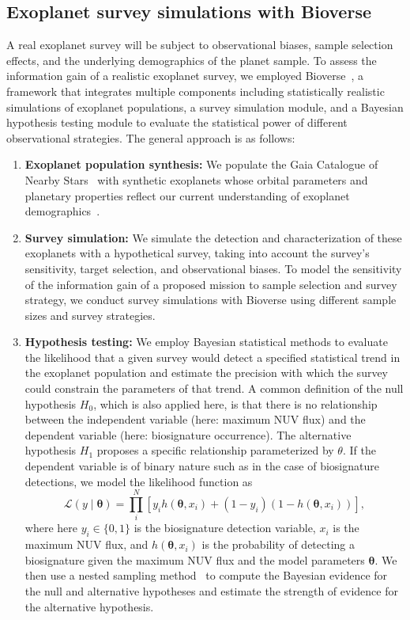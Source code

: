 \documentclass[twocolumn,twocolappendix,linenumbers]{aastex631}
\begin{document}
\subsection{Exoplanet survey simulations with Bioverse}
A real exoplanet survey will be subject to observational biases, sample selection effects, and the underlying demographics of the planet sample.
To assess the information gain of a realistic exoplanet survey, we employed Bioverse~\citep{Bixel2021}, a framework that integrates multiple components including statistically realistic simulations of exoplanet populations, a survey simulation module, and a Bayesian hypothesis testing module to evaluate the statistical power of different observational strategies.
The general approach is as follows:
\begin{enumerate}
\item \textbf{Exoplanet population synthesis:} We populate the Gaia Catalogue of Nearby Stars~\citep{Smart2021} with synthetic exoplanets whose orbital parameters and planetary properties reflect our current understanding of exoplanet demographics~\citep{Bergsten2022}.
    \item \textbf{Survey simulation:} We simulate the detection and characterization of these exoplanets with a hypothetical survey, taking into account the survey's sensitivity, target selection, and observational biases.
To model the sensitivity of the information gain of a proposed mission to sample selection and survey strategy, we conduct survey simulations with Bioverse using different sample sizes and survey strategies.
    \item \textbf{Hypothesis testing:} We employ Bayesian statistical methods to evaluate the likelihood that a given survey would detect a specified statistical trend in the exoplanet population and estimate the precision with which the survey could constrain the parameters of that trend.
    A common definition of the null hypothesis $H_0$, which is also applied here, is that there is no relationship between the independent variable (here: maximum NUV flux) and the dependent variable (here: biosignature occurrence).
    The alternative hypothesis $H_1$ proposes a specific relationship parameterized by $\theta$.
    If the dependent variable is of binary nature such as in the case of biosignature detections, we model the likelihood function as
    \begin{equation}
\mathcal{L}(y \mid \boldsymbol{\theta})=\prod_i^N\left[y_i h\left(\boldsymbol{\theta}, x_i\right)+\left(1-y_i\right)\left(1-h\left(\boldsymbol{\theta}, x_i\right)\right)\right],
\end{equation}
where here $y_i \in \{0,1\}$ is the biosignature detection variable, $x_i$ is the maximum NUV flux, and $h(\boldsymbol{\theta}, x_i)$ is the probability of detecting a biosignature given the maximum NUV flux and the model parameters $\boldsymbol{\theta}$.
We then use a nested sampling method~\citep{Speagle2020} to compute the Bayesian evidence for the null and alternative hypotheses and estimate the strength of evidence for the alternative hypothesis.


\end{enumerate}
\end{document}
